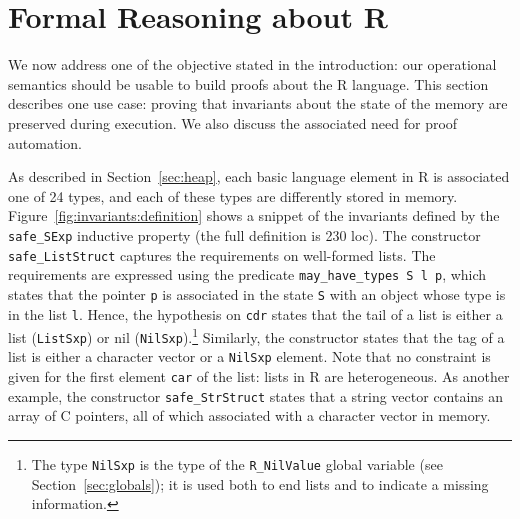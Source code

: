 \documentclass[
    sigplan,
    10pt,
    review, %
    natbib=false %
 ]{acmart}
\newcommand\CoqR{CoqR}
\begin{document}
%



\section{Formal Reasoning about R}
\label{sec:proofs}

We now address one of the objective stated in the introduction:
our operational semantics should be usable to build proofs about the R language. This section describes one use case:
proving that invariants about the state of the memory are preserved during execution. We also discuss the associated need for proof automation.

As described in Section~\ref{sec:heap},
each basic language element in R is associated one of 24 types,
and each of these types are differently stored in memory.
Figure~\ref{fig:invariants:definition} shows a snippet
of the invariants defined by the \texttt{safe_SExp} inductive property (the full definition is 230 loc).
%
The constructor \texttt{safe_ListStruct} captures the requirements on well-formed lists. The requirements are expressed using the predicate \texttt{may_have_types S l p}, which
states that the pointer \texttt{p}
is associated in the state \texttt{S} with an object
whose type is in the list \texttt{l}. Hence, the hypothesis on \texttt{cdr} states that the tail of a list is either a list
(\texttt{ListSxp}) or nil (\texttt{NilSxp}).\footnote{The type \texttt{NilSxp} is the type of the \texttt{R_NilValue} global variable (see Section~\ref{sec:globals}); it is used both to end lists and to indicate a missing information.}
Similarly, the constructor states that the tag
of a list is either a character vector or a \texttt{NilSxp} element.
Note that no constraint is given for the first element \texttt{car} of the list: lists in R are heterogeneous.
%
As another example, the constructor \texttt{safe_StrStruct} states that a string vector contains an array of C pointers,
all of which associated with a character vector in memory.
\end{document}
